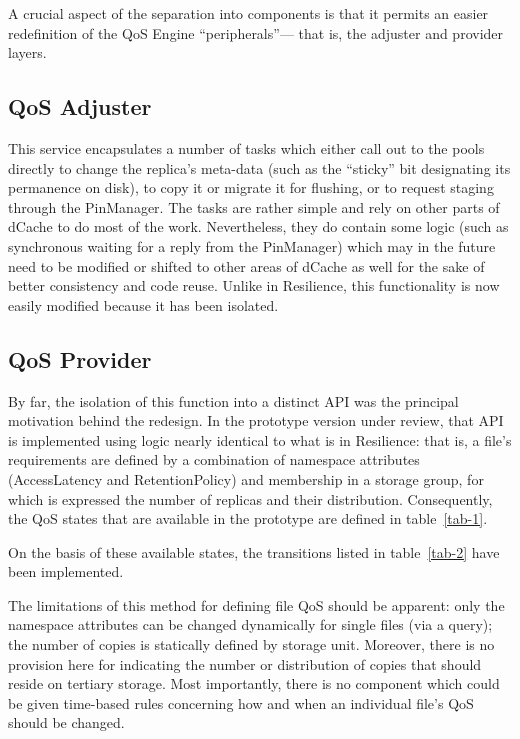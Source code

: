 \documentclass{webofc}
\begin{document}
A crucial aspect of the separation into components is that it permits an easier redefinition of the QoS Engine “peripherals”–– that is, the adjuster and provider layers. 
 

\subsection{QoS Adjuster}

This service encapsulates a number of tasks which either call out to the pools directly to change the replica’s meta-data (such as the “sticky” bit designating its permanence on disk), to copy it or migrate it for flushing, or to request staging through the PinManager.   The tasks are rather simple and rely on other parts of dCache to do most of the work.  Nevertheless, they do contain some logic (such as synchronous waiting for a reply from the PinManager) which may in the future need to be modified or shifted to other areas of dCache as well for the sake of better consistency and code reuse.  Unlike in Resilience, this functionality is now easily modified because it has been isolated.




\subsection{QoS Provider }

By far, the isolation of this function into a distinct API was the principal motivation behind the redesign.  In the prototype version under review, that API is implemented using logic nearly identical to what is in Resilience:  that is, a file’s requirements are defined by a combination of namespace attributes (AccessLatency and RetentionPolicy) and membership in a storage group, for which is expressed the number of replicas and their distribution.   Consequently, the QoS states that are available in the prototype are defined in table~\ref{tab-1}.



On the basis of these available states, the transitions listed in table~\ref{tab-2} have been implemented.


The limitations of this method for defining file QoS should be apparent:  only the namespace attributes can be changed dynamically for single files (via a query); the number of copies is statically defined by storage unit.  Moreover, there is no provision here for indicating the number or distribution of copies that should reside on tertiary storage.  Most importantly, there is no component which could be given time-based rules concerning how and when an individual file’s QoS should be changed.   
\end{document}
